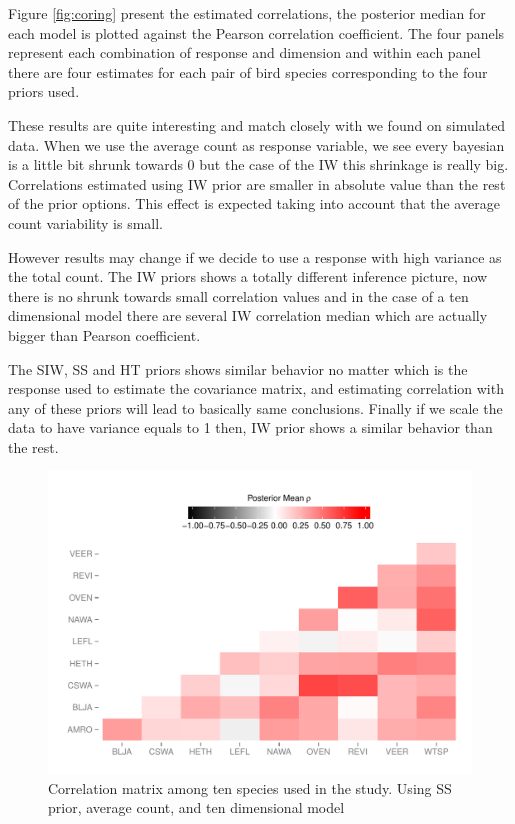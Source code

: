 \documentclass{article}
\begin{document}
Figure \ref{fig:coring} present the estimated correlations, the posterior median for each model is plotted against the Pearson correlation coefficient. The four panels represent each combination of response and dimension and within each panel there are four estimates for each pair of bird species corresponding to the four priors used. 

These results are quite interesting and match closely with we found on simulated data. When we use the average count as response variable, we see every bayesian is a little bit shrunk towards 0 but the case of the IW this shrinkage is really big. Correlations estimated using IW prior are smaller in absolute value than the rest of the prior options. This effect is expected taking into account that the average count variability is small. 

However results may change if we decide to use a response with high variance as the total count. The IW priors shows a totally different inference picture, now there is no shrunk towards small correlation values and in the case of a ten dimensional model there are several IW correlation median which are actually bigger than Pearson coefficient. 

The SIW, SS and HT priors shows similar behavior no matter which is the response used to estimate the covariance matrix, and estimating correlation with any of these priors will lead to basically same conclusions. Finally if we scale the data to have variance equals to 1 then, IW prior shows a similar behavior than the rest.

\begin{figure}[hbpt]
\centering
\includegraphics[width=\textwidth]{corrmat}
 \vspace{-.5in}
\caption{Correlation matrix among ten species used in the study. Using SS prior, average count, and ten dimensional model \label{fig:mat}}
\end{figure}
\end{document}
